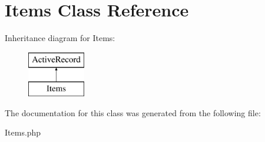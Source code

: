 \hypertarget{classapp_1_1models_1_1_items}{}\section{Items Class Reference}
\label{classapp_1_1models_1_1_items}
Inheritance diagram for Items\+:\begin{figure}[H]
\begin{center}
\leavevmode
\includegraphics[height=2.000000cm]{classapp_1_1models_1_1_items}
\end{center}
\end{figure}


The documentation for this class was generated from the following file\+:\begin{DoxyCompactItemize}
\item 
Items.\+php\end{DoxyCompactItemize}
